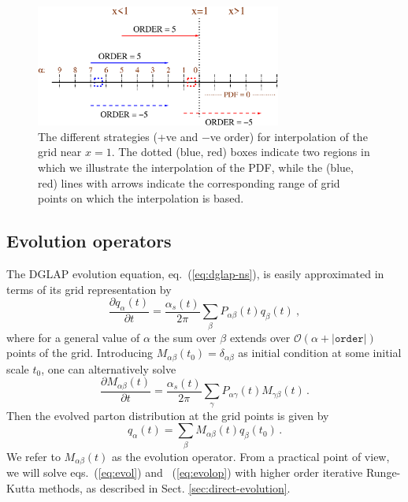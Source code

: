 \documentclass[12pt]{article}
\newcommand{\lp}{\left(}
\newcommand{\rp}{\right)}
\newcommand{\ttt}[1]{\texttt{#1}}
\begin{document}
\begin{figure}
  \centering
  \includegraphics[width=0.72\textwidth]{interpolation-order.eps}%
  \caption{The different strategies (+ve and $-$ve order) for
    interpolation of the grid near $x=1$. The dotted (blue, red) boxes
    indicate two regions in which we illustrate the interpolation of
    the PDF, while the (blue, red) lines with arrows indicate the
    corresponding range of grid points on which the interpolation is
    based.}
  \label{fig:interpolation-orders}
\end{figure}



\subsection{Evolution operators}
\label{sec:evop}
The DGLAP evolution equation, eq.~(\ref{eq:dglap-ns}), is easily 
approximated in terms of its grid representation by
\begin{equation}
\label{eq:evol}
  \frac{\partial q_{\alpha}(t)}{\partial t}  = \frac{\alpha_s(t)}{2\pi}
\sum_{\beta} P_{\alpha\beta}(t) q_\beta(t) \ ,
\end{equation}
where for a general value of $\alpha$ the sum over $\beta$ extends over
$\mathcal{O}\lp \alpha + |\ttt{order}| \rp$ 
points of the grid.
Introducing $M_{\alpha\beta}(t_0) = \delta_{\alpha\beta}$ as initial
condition at some initial scale $t_0$, one can
alternatively solve
\begin{equation}
\label{eq:evolop}
  \frac{\partial M_{\alpha\beta}(t) }{\partial t} = \frac{\alpha_s(t)}{2\pi}
\sum_{\gamma} P_{\alpha\gamma}(t)
  M_{\gamma\beta}(t)\,.
\end{equation}
Then the evolved parton distribution at the grid points is
given by
\begin{equation}
  q_{\alpha}(t)  = \sum_{\beta} M_{\alpha\beta}(t) q_\beta(t_0)\,.
\end{equation}
We refer to $M_{\alpha\beta}(t)$ as the evolution operator. From 
a practical point of view, we will solve eqs.~(\ref{eq:evol})
and ~(\ref{eq:evolop})
with higher order iterative Runge-Kutta methods, as described in
Sect. \ref{sec:direct-evolution}.
\end{document}
